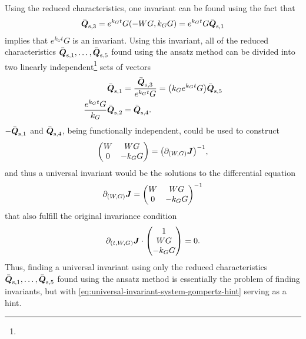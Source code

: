 Using the reduced characteristics, one invariant can be found using the fact that
\begin{equation*}
  \bar{\vect{Q}}_{\text{s},3} = e^{k_{G} t} G \left(-W G, k_G G\right) = e^{k_{G} t} G \bar{\vect{Q}}_{\text{s},1}
\end{equation*}
implies that \(e^{k_{G} t} G\) is an invariant.
Using this invariant, all of the reduced characteristics \(\bar{\boldsymbol{Q}}_{\text{s},1}, \dots, \bar{\boldsymbol{Q}}_{\text{s},5}\) found using the ansatz method can be divided into two linearly independent\footnote{} sets of vectors %
\begin{align*}
  \bar{\vect{Q}}_{\text{s},1} &= \frac{\bar{\vect{Q}}_{\text{s},3}}{e^{k_{G} t} G} = \left(k_G e^{k_{G} t} G\right) \bar{\vect{Q}}_{\text{s},5} \\
  \frac{e^{k_{G} t} G}{k_G} \bar{\vect{Q}}_{\text{s},2} &= \bar{\vect{Q}}_{\text{s},4}.
\end{align*}
\(-\bar{\boldsymbol{Q}}_{\text{s},1}\) and \(\bar{\boldsymbol{Q}}_{\text{s},4}\), being functionally independent, could be used to construct
\begin{equation*}
  \begin{pmatrix}
    W & W G \\
    0 & -k_G G
  \end{pmatrix}
  = \left(\partial_{(W, G)} \vect{J}\right)^{-1},
\end{equation*}
and thus a universal invariant would be the solutions to the differential equation
\begin{equation} \label{eq:universal-invariant-system-gompertz-hint}
  \partial_{(W, G)} \boldsymbol{J} =
  \begin{pmatrix}
    W & W G \\
    0 & -k_G G
  \end{pmatrix}^{-1}
\end{equation}
that also fulfill the original invariance condition
\begin{equation*}
  \partial_{(t, W, G)} \boldsymbol{J} \cdot
  \begin{pmatrix}
    1 \\
    W G \\
    -k_G G
  \end{pmatrix}
  = 0.
\end{equation*}
Thus, finding a universal invariant using only the reduced characteristics \(\bar{\boldsymbol{Q}}_{\text{s},1}, \dots, \bar{\boldsymbol{Q}}_{\text{s},5}\) found using the ansatz method is essentially the problem of finding invariants, but with \cref{eq:universal-invariant-system-gompertz-hint} serving as a hint.
